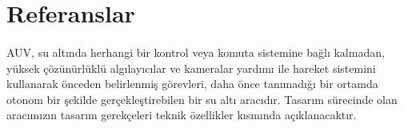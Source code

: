 \documentclass[12pt]{article}
\begin{document}
\section{Referanslar}

\begin{justify}
\paragraph{} AUV, su altında herhangi bir kontrol veya komuta sistemine bağlı kalmadan, yüksek çözünürlüklü algılayıcılar ve kameralar yardımı ile hareket sistemini kullanarak önceden belirlenmiş görevleri, daha önce tanımadığı bir ortamda otonom bir şekilde gerçekleştirebilen bir su altı aracıdır. Tasarım sürecinde olan aracımızın tasarım gerekçeleri teknik özellikler kısmında açıklanacaktır.
\end{justify}


\end{document}
